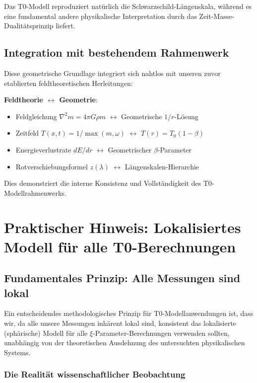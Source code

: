 \documentclass[12pt,a4paper]{article}
\begin{document}
Das T0-Modell reproduziert natürlich die Schwarzschild-Längenskala, während es eine fundamental andere physikalische Interpretation durch das Zeit-Masse-Dualitätsprinzip liefert.

\subsection{Integration mit bestehendem Rahmenwerk}
\label{subsec:integration_existing}

Diese geometrische Grundlage integriert sich nahtlos mit unseren zuvor etablierten feldtheoretischen Herleitungen:

\textbf{Feldtheorie $\leftrightarrow$ Geometrie}:
\begin{itemize}
	\item Feldgleichung $\nabla^2 m = 4\pi G \rho m$ $\leftrightarrow$ Geometrische $1/r$-Lösung
	\item Zeitfeld $T(x,t) = 1/\max(m,\omega)$ $\leftrightarrow$ $T(r) = T_0(1-\beta)$
	\item Energieverlustrate $dE/dr$ $\leftrightarrow$ Geometrischer $\beta$-Parameter
	\item Rotverschiebungsformel $z(\lambda)$ $\leftrightarrow$ Längenskalen-Hierarchie
\end{itemize}

Dies demonstriert die interne Konsistenz und Vollständigkeit des T0-Modellrahmenwerks.
\section{Praktischer Hinweis: Lokalisiertes Modell für alle T0-Berechnungen}
\label{sec:localized_model_universal}

\subsection{Fundamentales Prinzip: Alle Messungen sind lokal}
\label{subsec:all_measurements_local}

Ein entscheidendes methodologisches Prinzip für T0-Modellanwendungen ist, dass wir, da alle unsere Messungen inhärent lokal sind, konsistent das lokalisierte (sphärische) Modell für alle $\xi$-Parameter-Berechnungen verwenden sollten, unabhängig von der theoretischen Ausdehnung des untersuchten physikalischen Systems.

\subsubsection{Die Realität wissenschaftlicher Beobachtung}
\label{subsubsec:reality_scientific_observation}
\end{document}

